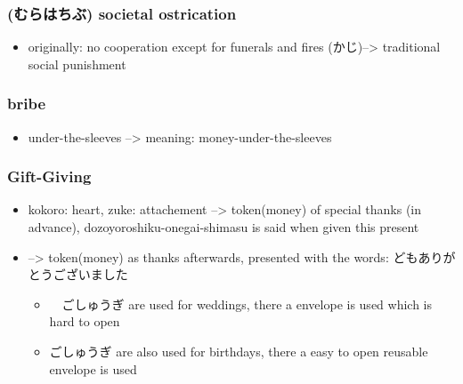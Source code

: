 \documentclass{article}
\newcommand\tabni[1][0.2cm]{\hspace*{#1}}
\begin{document}
\subsubsection{(むらはちぶ) \tabni societal ostrication}
\begin{itemize}%
\item originally: no cooperation except for funerals and fires (かじ)--> traditional social punishment \\
\end{itemize}
\subsubsection{ \tabni bribe}
\begin{itemize}%
\item {} under-the-sleeves --> meaning: money-under-the-sleeves \\
\end{itemize}
\subsubsection{Gift-Giving}
\begin{itemize}
\item {} kokoro: heart, zuke: attachement	--> token(money) of special thanks (in advance),	dozoyoroshiku-onegai-shimasu is said when given this present
\item {} --> token(money) as thanks afterwards, presented with the words: どもありがとうございました
\begin{itemize}%
\item　ごしゅうぎ are used for weddings, there a envelope is used which is hard to open
\item ごしゅうぎ are also used for birthdays, there a easy to open reusable envelope is used \\
\end{itemize}
\end{itemize}
\end{document}

